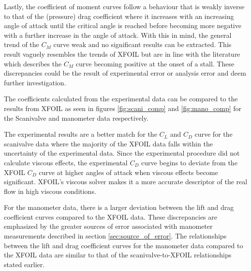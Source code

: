 \documentclass[runningheads]{llncs}
\begin{document}
\noindent
Lastly, the coefficient of moment curves follow a behaviour that is weakly inverse to that of the (pressure) drag coefficient where it increases with an increasing angle of attack until the critical angle is reached before becoming more negative with a further increase in the angle of attack. With this in mind, the general trend of the $C_M$ curve weak and no significant results can be extracted. This result vaguely resembles the trends of XFOIL but are in line with the literature which describes the $C_M$ curve becoming positive at the onset of a stall. These discrepancies could be the result of experimental error or analysis error and deem further investigation. \newline

\noindent
The coefficients calculated from the experimental data can be compared to the results from XFOIL as seen in figures \ref{fig:scani_comp} and \ref{fig:mano_comp} for the Scanivalve and manometer data respectively.\newline

\noindent
The experimental results are a better match for the $C_L$ and $C_D$ curve for the scanivalve data where the majority of the XFOIL data falls within the uncertainty of the experimental data. Since the experimental procedure did not calculate viscous effects, the experimental $C_D$ curve begins to deviate from the XFOIL $C_D$ curve at higher angles of attack when viscous effects become significant. XFOIL's viscous solver makes it a more accurate descriptor of the real flow in high viscous conditions. \newline

\noindent
For the manometer data, there is a larger deviation between the lift and drag coefficient curves compared to the XFOIL data. These discrepancies are emphasized by the greater sources of error associated with manometer measurements described in section \ref{sec:source_of_error}. The relationships between the lift and drag coefficient curves for the manometer data compared to the XFOIL data are similar to that of the scanivalve-to-XFOIL relationships stated earlier.
\end{document}
